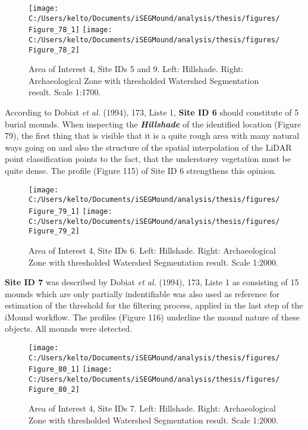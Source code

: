 \documentclass[
  12pt,
]{article}
\begin{document}
\begin{figure}
\texttt{[image: C:/Users/kelto/Documents/iSEGMound/analysis/thesis/figures/Figure\_78\_1]} \texttt{[image: C:/Users/kelto/Documents/iSEGMound/analysis/thesis/figures/Figure\_78\_2]} \caption{Area of Interest 4, Site IDs 5 and 9. Left: Hillshade. Right: Archaeological Zone with thresholded Watershed Segmentation result. Scale 1:1700.}\label{fig:Figure78}
\end{figure}

According to Dobiat \emph{et al.} (1994), 173, Liste 1, \textbf{Site ID 6} should constitute of 5 burial mounds. When inspecting the \textbf{\emph{Hillshade}} of the identified location (Figure 79), the first thing that is visible that it is a quite rough area with many natural ways going on and also the structure of the spatial interpolation of the LiDAR point classification points to the fact, that the understorey vegetation must be quite dense. The profile (Figure 115) of Site ID 6 strengthens this opinion.

\begin{figure}
\texttt{[image: C:/Users/kelto/Documents/iSEGMound/analysis/thesis/figures/Figure\_79\_1]} \texttt{[image: C:/Users/kelto/Documents/iSEGMound/analysis/thesis/figures/Figure\_79\_2]} \caption{Area of Interest 4, Site IDs 6. Left: Hillshade. Right: Archaeological Zone with thresholded Watershed Segmentation result. Scale 1:2000.}\label{fig:Figure79}
\end{figure}

\textbf{Site ID 7} was described by Dobiat \emph{et al.} (1994), 173, Liste 1 as consisting of 15 mounds which are only partially indentifiable was also used as reference for estimation of the threshold for the filtering process, applied in the last step of the iMound workflow. The profiles (Figure 116) underline the mound nature of these objects. All mounds were detected.

\begin{figure}
\texttt{[image: C:/Users/kelto/Documents/iSEGMound/analysis/thesis/figures/Figure\_80\_1]} \texttt{[image: C:/Users/kelto/Documents/iSEGMound/analysis/thesis/figures/Figure\_80\_2]} \caption{Area of Interest 4, Site IDs 7. Left: Hillshade. Right: Archaeological Zone with thresholded Watershed Segmentation result. Scale 1:2000.}\label{fig:Figure80}
\end{figure}
\end{document}
